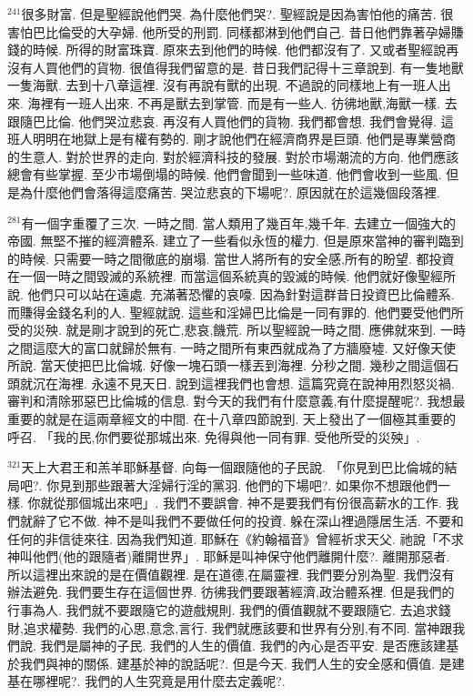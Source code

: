\documentclass{book}
\begin{document}
$^{241}$很多財富.
但是聖經說他們哭.
為什麼他們哭?.
聖經說是因為害怕他的痛苦.
很害怕巴比倫受的大孕婦.
他所受的刑罰.
同樣都淋到他們自己.
昔日他們靠著孕婦賺錢的時候.
所得的財富珠寶.
原來去到他們的時候.
他們都沒有了.
又或者聖經說再沒有人買他們的貨物.
很值得我們留意的是.
昔日我們記得十三章說到.
有一隻地獸 一隻海獸.
去到十八章這裡.
沒有再說有獸的出現.
不過說的同樣地上有一班人出來.
海裡有一班人出來.
不再是獸去到掌管.
而是有一些人.
彷彿地獸,海獸一樣.
去跟隨巴比倫.
他們哭泣悲哀.
再沒有人買他們的貨物.
我們都會想.
我們會覺得.
這班人明明在地獄上是有權有勢的.
剛才說他們在經濟商界是巨頭.
他們是專業營商的生意人.
對於世界的走向.
對於經濟科技的發展.
對於市場潮流的方向.
他們應該總會有些掌握.
至少市場倒塌的時候.
他們會聞到一些味道.
他們會收到一些風.
但是為什麼他們會落得這麼痛苦.
哭泣悲哀的下場呢?.
原因就在於這幾個段落裡.

$^{281}$有一個字重覆了三次.
一時之間.
當人類用了幾百年,幾千年.
去建立一個強大的帝國.
無堅不摧的經濟體系.
建立了一些看似永恆的權力.
但是原來當神的審判臨到的時候.
只需要一時之間徹底的崩塌.
當世人將所有的安全感,所有的盼望.
都投資在一個一時之間毀滅的系統裡.
而當這個系統真的毀滅的時候.
他們就好像聖經所說.
他們只可以站在遠處.
充滿著恐懼的哀嚎.
因為針對這群昔日投資巴比倫體系.
而賺得金錢名利的人.
聖經就說.
這些和淫婦巴比倫是一同有罪的.
他們要受他們所受的災殃.
就是剛才說到的死亡,悲哀,饑荒.
所以聖經說一時之間.
應佛就來到.
一時之間這麼大的富口就歸於無有.
一時之間所有東西就成為了方牆廢墟.
又好像天使所說.
當天使把巴比倫城.
好像一塊石頭一樣丟到海裡.
分秒之間.
幾秒之間這個石頭就沉在海裡.
永遠不見天日.
說到這裡我們也會想.
這篇究竟在說神用烈怒災禍.
審判和清除邪惡巴比倫城的信息.
對今天的我們有什麼意義,有什麼提醒呢?.
我想最重要的就是在這兩章經文的中間.
在十八章四節說到.
天上發出了一個極其重要的呼召.
「我的民,你們要從那城出來.
免得與他一同有罪.
受他所受的災殃」.

$^{321}$天上大君王和羔羊耶穌基督.
向每一個跟隨他的子民說.
「你見到巴比倫城的結局吧?.
你見到那些跟著大淫婦行淫的黨羽.
他們的下場吧?.
如果你不想跟他們一樣.
你就從那個城出來吧」.
我們不要誤會.
神不是要我們有份很高薪水的工作.
我們就辭了它不做.
神不是叫我們不要做任何的投資.
躲在深山裡過隱居生活.
不要和任何的非信徒來往.
因為我們知道.
耶穌在《約翰福音》曾經祈求天父.
祂說「不求神叫他們(他的跟隨者)離開世界」.
耶穌是叫神保守他們離開什麼?.
離開那惡者.
所以這裡出來說的是在價值觀裡.
是在道德,在屬靈裡.
我們要分別為聖.
我們沒有辦法避免.
我們要生存在這個世界.
彷彿我們要跟著經濟,政治體系裡.
但是我們的行事為人.
我們就不要跟隨它的遊戲規則.
我們的價值觀就不要跟隨它.
去追求錢財,追求權勢.
我們的心思,意念,言行.
我們就應該要和世界有分別,有不同.
當神跟我們說.
我們是屬神的子民.
我們的人生的價值.
我們的內心是否平安.
是否應該建基於我們與神的關係.
建基於神的說話呢?.
但是今天.
我們人生的安全感和價值.
是建基在哪裡呢?.
我們的人生究竟是用什麼去定義呢?.
\end{document}
